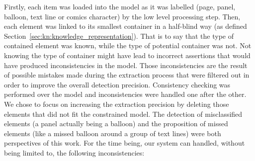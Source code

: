 Firstly, each item was loaded into the model as it was labelled (page, panel, balloon, text line or comics character) by the low level processing step.
Then, each element was linked to its smallest container in a half-blind way (as defined Section~\ref{sec:kn:knowledge_representation}).
That is to say that the type of contained element was known, while the type of  potential container was not.
Not knowing the type of container might have lead to incorrect assertions that would have produced inconsistencies in the model.
Those inconsistencies are the result of possible mistakes made during the extraction process that were filtered out in order to improve the overall detection precision.
Consistency checking was performed over the model and inconsistencies were handled one after the other.
We chose to focus on increasing the extraction precision by deleting those elements that did not fit the constrained model.
The detection of misclassified elements (a panel actually being a balloon) and the proposition of missed elements (like a missed balloon around a group of text lines) were both perspectives of this work.
For the time being, our system can handled, without being limited to, the following inconsistencies:

